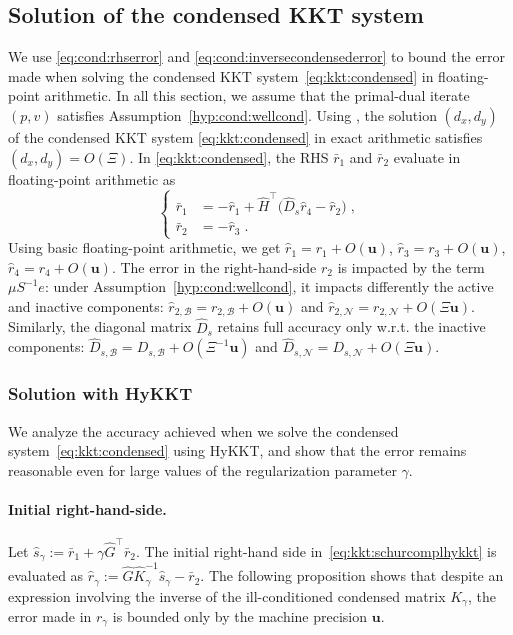 \documentclass[smallextended]{svjour3}
\newcommand{\epstol}{\mathbf{u}}
\newcommand{\cactive}{\mathcal{B}}
\newcommand{\cinactive}{\mathcal{N}}
\begin{document}
\subsection{Solution of the condensed KKT system}
We use \eqref{eq:cond:rhserror} and \eqref{eq:cond:inversecondensederror}
to bound the error made when solving the condensed KKT system~\eqref{eq:kkt:condensed}
in floating-point arithmetic.
In all this section, we assume that
the primal-dual iterate $(p,v)$ satisfies Assumption~\ref{hyp:cond:wellcond}.
Using \cite[Corollary 3.3]{wright2001effects}, the solution $(d_x, d_y)$ of the
condensed KKT system \eqref{eq:kkt:condensed} in exact arithmetic satisfies
$(d_x, d_y) = O(\Xi)$.
In \eqref{eq:kkt:condensed}, the RHS $\bar{r}_1$ and $\bar{r}_2$
evaluate in floating-point arithmetic as
\begin{equation}
  \label{eq:cond:condensedrhs}
  \left\{
  \begin{aligned}
    \bar{r}_1 &= - \widehat{r}_1 + \widehat{H}^\top\big(\widehat{D}_{s} \widehat{r}_{4} - \widehat{r}_{2} \big) \;, \\
     \bar{r}_2 &= -\widehat{r}_3 \; .
  \end{aligned}
  \right.
\end{equation}
Using basic floating-point arithmetic, we get
$\widehat{r}_1 = r_1 + O(\epstol)$,
$\widehat{r}_3 = r_3 + O(\epstol)$,
$\widehat{r}_4 = r_4 + O(\epstol)$.
The error in the right-hand-side $r_2$ is impacted by the term $\mu S^{-1}e$:
under Assumption~\ref{hyp:cond:wellcond}, it impacts differently
the active and inactive components:
$\widehat{r}_{2,\cactive}= r_{2,\cactive} + O(\epstol)$ and
$\widehat{r}_{2,\cinactive}= r_{2,\cinactive} + O(\Xi \epstol)$.
Similarly, the diagonal matrix $\widehat{D}_s$ retains full accuracy only
w.r.t. the inactive components: $\widehat{D}_{s,\cactive} = D_{s,\cactive} + O(\Xi^{-1} \epstol)$
and $\widehat{D}_{s,\cinactive} = D_{s,\cinactive} + O(\Xi \epstol)$.

\subsubsection{Solution with HyKKT}
We analyze the accuracy achieved when we solve the condensed system~\eqref{eq:kkt:condensed}
using HyKKT,
and show that the error remains reasonable even for large values of
the regularization parameter $\gamma$.

\paragraph{Initial right-hand-side.}
Let $\widehat{s}_\gamma := \bar{r}_1 + \gamma \widehat{G}^\top \bar{r}_2$.
The initial right-hand side in~\eqref{eq:kkt:schurcomplhykkt}
is evaluated as
$\widehat{r}_\gamma :=\widehat{G} \widehat{K}_\gamma^{-1} \widehat{s}_\gamma - \bar{r}_2$.
The following proposition shows that despite an expression involving the inverse
of the ill-conditioned condensed matrix $K_\gamma$, the error made in $r_\gamma$
is bounded only by the machine precision $\epstol$.
\end{document}
